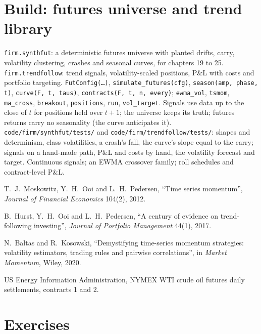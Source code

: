 \section{Build: futures universe and trend library}\label{bld:s1:trend-following:trend}

\begin{build}
 \texttt{firm.synthfut}: a deterministic futures universe with planted drifts, carry, volatility clustering, crashes and seasonal curves,
for chapters 19 to 25. \texttt{firm.trendfollow}: trend signals, volatility-scaled positions, P\&L with costs and portfolio targeting.
 \texttt{FutConfig(\dots)}, \texttt{simulate\_futures(cfg)}, \texttt{season(amp, phase, t)}, \texttt{curve(F, t, taus)},
\texttt{contracts(F, t, n, every)}; \texttt{ewma\_vol}, \texttt{tsmom}, \texttt{ma\_cross}, \texttt{breakout}, \texttt{positions}, \texttt{run},
\texttt{vol\_target}.
 Signals use data up to the close of $t$ for positions held over $t + 1$; the universe keeps its truth; futures returns carry no seasonality
(the curve anticipates it).
 \texttt{code/firm/synthfut/tests/} and \texttt{code/firm/trendfollow/tests/}: shapes and determinism, class volatilities,
a crash's fall, the curve's slope equal to the carry; signals on a hand-made path, P\&L and costs by hand, the volatility forecast and target.
 Continuous signals; an EWMA crossover family; roll schedules and contract-level P\&L.
\end{build}

\begin{omsources}
\item T.~J.~Moskowitz, Y.~H.~Ooi and L.~H.~Pedersen, ``Time series momentum'', \emph{Journal of Financial Economics} 104(2), 2012.
\item B.~Hurst, Y.~H.~Ooi and L.~H.~Pedersen, ``A century of evidence on trend-following investing'', \emph{Journal of Portfolio Management} 44(1), 2017.
\item N.~Baltas and R.~Kosowski, ``Demystifying time-series momentum strategies: volatility estimators, trading rules and pairwise correlations'', in
\emph{Market Momentum}, Wiley, 2020.
\item US Energy Information Administration, NYMEX WTI crude oil futures daily settlements, contracts 1 and 2.
\end{omsources}

\section{Exercises}

